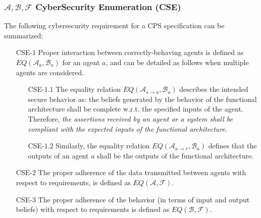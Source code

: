 \documentclass[runningheads]{llncs}
\newcommand{\assertionRegion}{\mathcal{A}}
\newcommand{\beliefRegion}{\mathcal{B}}
\newcommand{\factRegion}{\mathcal{F}}
\newcommand{\abf}{\assertionRegion,\beliefRegion,\factRegion}
\newcommand{\eq}[2]{EQ(#1,#2)}
\begin{document}
\subsubsection{$\abf$ CyberSecurity Enumeration (CSE)} The following cybersecurity
requirement for a CPS specification can be summarized:
\begin{enumerate}
	\item[CSE-$1$] Proper interaction between correctly-behaving agents is
		defined as $\eq{\assertionRegion_a}{\beliefRegion_a}$ for an
		agent $a$, and can be detailed as follows when multiple agents
		are considered.
	\begin{enumerate}
		\item[CSE-$1.1$] The equality relation
			$\eq{\assertionRegion_{s\rightarrow
			a}}{\beliefRegion_a}$ describes the intended secure
			behavior as: the beliefs generated by the behavior of
			the functional architecture shall be complete w.r.t.
			the specified inputs of the agent. Therefore, \emph{the
			assertions received by an agent or a system shall be
			compliant with the expected inputs of the functional
			architecture}.
		\item[CSE-$1.2$] Similarly, the equality relation
			$\eq{\assertionRegion_{a\rightarrow
			r}}{\beliefRegion_a}$ defines that the outputs of an
			agent $a$ shall be the outputs of the functional
			architecture.
	\end{enumerate}
\item[CSE-$2$] The proper adherence of the data transmitted between agents with respect to
	requirements, is defined as $\eq{\assertionRegion}{\factRegion}$. 
\item[CSE-$3$] The proper adherence of the behavior (in terms of input and output beliefs) with respect to
		requirements is defined as $\eq{\beliefRegion}{\factRegion}$.
\end{enumerate}
\end{document}
